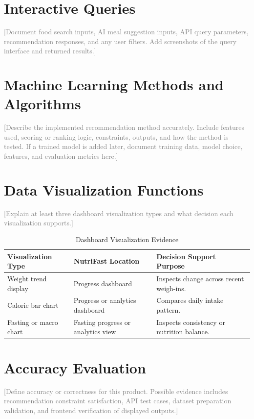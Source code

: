 \documentclass[12pt]{report}
\newcommand{\placeholder}[1]{\textcolor{gray}{[#1]}}
\begin{document}
\section{Interactive Queries}
\placeholder{Document food search inputs, AI meal suggestion inputs, API query parameters, recommendation responses, and any user filters. Add screenshots of the query interface and returned results.}

\section{Machine Learning Methods and Algorithms}
\placeholder{Describe the implemented recommendation method accurately. Include features used, scoring or ranking logic, constraints, outputs, and how the method is tested. If a trained model is added later, document training data, model choice, features, and evaluation metrics here.}

\section{Data Visualization Functions}
\placeholder{Explain at least three dashboard visualization types and what decision each visualization supports.}

\begin{table}[H]
    \centering
    \caption{Dashboard Visualization Evidence}
    \begin{tabular}{p{} p{} p{}}
        \toprule
        Visualization Type & NutriFast Location & Decision Support Purpose \\
        \midrule
        Weight trend display & Progress dashboard & Inspects change across recent weigh-ins. \\
        Calorie bar chart & Progress or analytics dashboard & Compares daily intake pattern. \\
        Fasting or macro chart & Fasting progress or analytics view & Inspects consistency or nutrition balance. \\
        \bottomrule
    \end{tabular}
\end{table}

\section{Accuracy Evaluation}
\placeholder{Define accuracy or correctness for this product. Possible evidence includes recommendation constraint satisfaction, API test cases, dataset preparation validation, and frontend verification of displayed outputs.}
\end{document}
